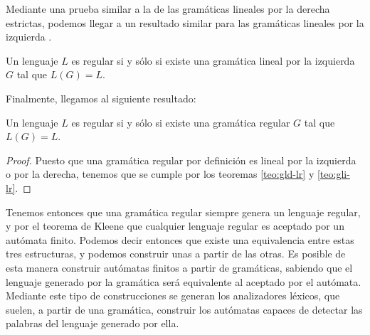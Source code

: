Mediante una prueba similar a la de las gramáticas lineales por la derecha estrictas, podemos llegar a un resultado
similar para las gramáticas lineales por la izquierda \cite{pfenning_2000}.

\begin{teorema}\label{teo:gli-lr}Un lenguaje $L$ es regular si y sólo si existe una gramática lineal por la izquierda 
$G$ tal que $L(G)=L$.
\end{teorema}

Finalmente, llegamos al siguiente resultado:

\begin{teorema}Un lenguaje $L$ es regular si y sólo si existe una gramática regular $G$ tal que $L(G)=L$.
\end{teorema}
\begin{proof}
Puesto que una gramática regular por definición es lineal por la izquierda o por la derecha, tenemos que se cumple por
los teoremas \ref{teo:gld-lr} y \ref{teo:gli-lr}.
\end{proof}

Tenemos entonces que una gramática regular siempre genera un lenguaje regular, y por el teorema de Kleene que cualquier
lenguaje regular es aceptado por un autómata finito. Podemos decir entonces que existe una equivalencia entre estas
tres estructuras, y podemos construir unas a partir de las otras. Es posible de esta manera construir autómatas finitos
a partir de gramáticas, sabiendo que el lenguaje generado por la gramática será equivalente al aceptado por el 
autómata. Mediante este tipo de construcciones se generan los analizadores léxicos, que suelen, a partir de una 
gramática, construir los autómatas capaces de detectar las palabras del lenguaje generado por ella.

\endinput
